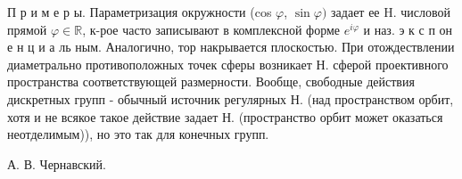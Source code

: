 \documentclass[10pt]{article}
\begin{document}
П р и м е р ы. Параметризация окружности (cos $\varphi$, $\sin \varphi)$ задает ее H. числовой прямой $\varphi \in \mathbb{R}$, к-рое часто записывают в комплексной форме $e^{i \varphi}$ и наз. э к с п он е н ц и а ль ным. Аналогично, тор накрывается плоскостью. При отождествлении диаметрально противоположных точек сферы возникает Н. сферой проективного пространства соответствующей размерности. Вообще, свободные действия дискретных групп - обычный источник регулярных Н. (над пространством орбит, хотя и не всякое такое действие задает Н. (пространство орбит может оказаться неотделимым)), но это так для конечных групп.



А. В. Чернавский.
\end{document}
